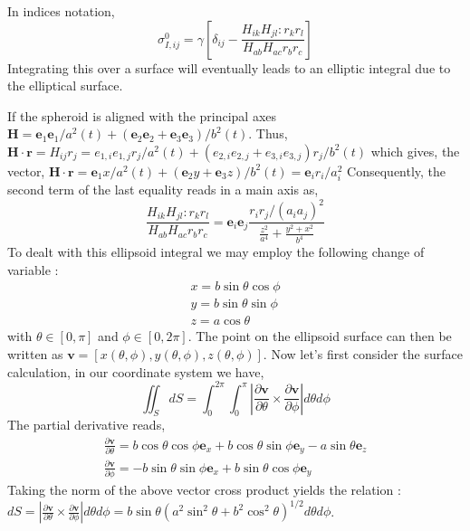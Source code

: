 In indices notation,  
\begin{equation*}
    \sigma_{I,ij}^0 =\gamma\left[
    \delta_{ij} - \frac{ H_{ik} H_{jl} :  r_kr_l}{  H_{ab}  H_{ac} r_br_c} \right]
\end{equation*}
Integrating this over a surface will eventually leads to an elliptic integral due to the elliptical surface. 

If the spheroid is aligned with the principal axes $\textbf{H} = \textbf{e}_1\textbf{e}_1 / a^2(t) + (\textbf{e}_2\textbf{e}_2+ \textbf{e}_3\textbf{e}_3)/b^2(t)$.
Thus, $\textbf{H}\cdot \textbf{r} = H_{ij} r_j = {e}_{1,i}{e}_{1,j}r_j / a^2(t) + ({e}_{2,i}{e}_{2,j} + {e}_{3,i}{e}_{3,j})r_j/b^2(t) $ which gives, the vector, 
$\textbf{H}\cdot \textbf{r} = \textbf{e}_{1} x/ a^2(t) + (\textbf{e}_{2}y + \textbf{e}_{3}z)/b^2(t)  = \textbf{e}_i r_i /a_i^2$
Consequently, the second term of the last equality reads in a main axis as, 
\begin{equation*}
    \frac{ H_{ik} H_{jl} :  r_kr_l}{  H_{ab}  H_{ac} r_br_c} 
    = \textbf{e}_i \textbf{e}_j \frac{ r_i r_j /(a_i a_j)^2 }
    {\frac{z^2}{a^4}+\frac{y^2+x^2}{b^4}}
\end{equation*}
To dealt with this ellipsoid integral we may employ the following change of variable :
\begin{align*}
    x = b \sin \theta \cos \phi\\
    y = b \sin \theta \sin \phi\\
    z = a \cos \theta 
\end{align*}
with $\theta \in [0,\pi]$ and $\phi \in [0,2\pi]$. 
The point on the ellipsoid surface can then be written as $\textbf{v} = [x(\theta,\phi),y(\theta,\phi),z(\theta,\phi)]$. 
Now let's first consider the surface calculation, in our coordinate system we have, 
\begin{equation*}
    \iint_S dS
    = 
    \int_{0}^{2\pi}
    \int_{0}^{\pi}
    \left|\frac{\partial \textbf{v}}{\partial \theta} 
    \times 
    \frac{\partial \textbf{v}}{\partial \phi} \right|
    d\theta
    d\phi
\end{equation*}
The partial derivative reads, 
\begin{align*}
    \frac{\partial \textbf{v}}{\partial \theta}
    = 
    b \cos \theta \cos \phi \textbf{e}_x
    + b \cos \theta \sin \phi\textbf{e}_y
    - a \sin \theta \textbf{e}_z
    \\
    \frac{\partial \textbf{v}}{\partial \phi}
    = 
    - b \sin \theta \sin \phi \textbf{e}_x
    + b \sin \theta \cos \phi\textbf{e}_y
\end{align*}
Taking the norm of the above vector cross product yields the relation : 
$dS = \left|\frac{\partial \textbf{v}}{\partial \theta} 
\times 
\frac{\partial \textbf{v}}{\partial \phi} \right| d\theta d\phi = b \sin\theta (a^2\sin^2\theta+ b^2 \cos^2\theta)^{1/2}d\theta d\phi$. 

